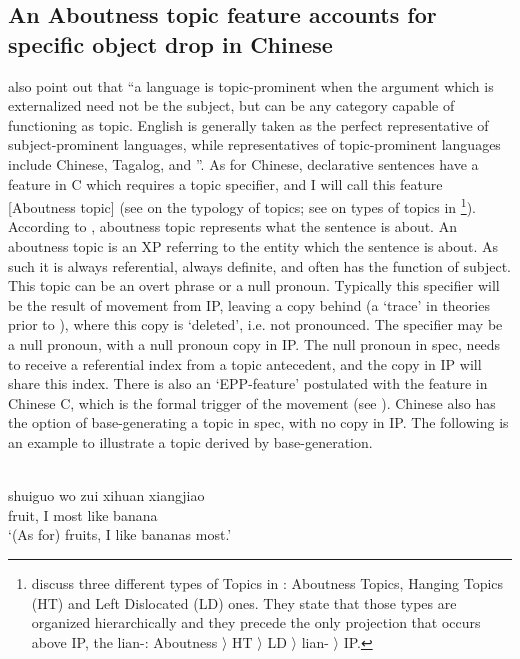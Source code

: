 \documentclass[output=paper]{LSP/langsci}
\begin{document}
\subsection{An Aboutness topic feature accounts for specific object drop in Chinese}
 \citet[78]{HolmbergNikanne2002} also point out that “a language is topic-prominent when the argument which is externalized need not be the subject, but can be any category capable of functioning as topic. English is generally taken as the perfect representative of subject-prominent languages, while representatives of topic-prominent languages include Chinese, Tagalog, and ”. As for Chinese, declarative sentences have a feature in C which requires a topic specifier, and I will call this feature [Aboutness topic] (see \citealt{FrascarelliHinterhölzl2007} on the typology of topics; see \citealt{BadanDelGobbo2011} on types of topics in \footnote{\citet{BadanDelGobbo2011} discuss three different types of Topics in : Aboutness Topics, Hanging Topics (HT) and Left Dislocated (LD) ones. They state that those types are organized hierarchically and they precede the only  projection that occurs above IP, the lian-: Aboutness  〉 HT 〉 LD 〉 lian- 〉 IP.}). According to \citet{Lambrecht1994}, aboutness topic represents what the sentence is about. An aboutness topic is an XP referring to the entity which the sentence is about. As such it is always referential, always definite, and often has the function of subject. This topic can be an overt phrase or a null pronoun. Typically this specifier will be the result of movement from IP, leaving a copy behind (a ‘trace’ in theories prior to \citealt{Chomsky1995}), where this copy is ‘deleted’, i.e. not pronounced. The specifier may be a null pronoun, with a null pronoun copy in IP. The null pronoun in spec,  needs to receive a referential index from a topic antecedent, and the copy in IP will share this index. There is also an ‘EPP-feature’ postulated with the  feature in Chinese C, which is the formal trigger of the movement (see \citealt{Chomsky1995,Chomsky2001}). Chinese also has the option of base-generating a topic in spec,  with no copy in IP. The following is an example to illustrate a topic derived by base-generation.


\ea%
    \label{ex:li:11}
 \citep[202]{HuangEtAl2009}\\
    \gll  shuiguo  wo   zui   xihuan   xiangjiao\\
	  fruit,   I   most   like   banana\\
    \glt ‘(As for) fruits, I like bananas most.’      
    \z
\end{document}
